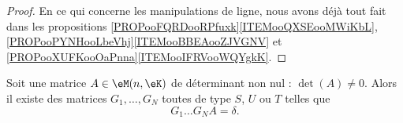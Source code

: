 \begin{proof}
	En ce qui concerne les manipulations de ligne, nous avons déjà tout fait dans les propositions \ref{PROPooFQRDooRPfuxk}\ref{ITEMooQXSEooMWiKbL}, \ref{PROPooPYNHooLbeVhj}\ref{ITEMooBBEAooZJVGNV} et \ref{PROPooXUFKooOaPnna}\ref{ITEMooIFRVooWQYgkK}.

\end{proof}

\begin{proposition}        \label{PROPooJBTZooNLobpf}
	Soit une matrice \( A\in \eM(n,\eK)\) de déterminant non nul : \( \det(A)\neq 0\). Alors il existe des matrices \( G_1,\ldots, G_N\) toutes de type \( S\), \( U\) ou \( T\) telles que
	\begin{equation}
		G_1\ldots G_NA=\delta.
	\end{equation}
\end{proposition}

